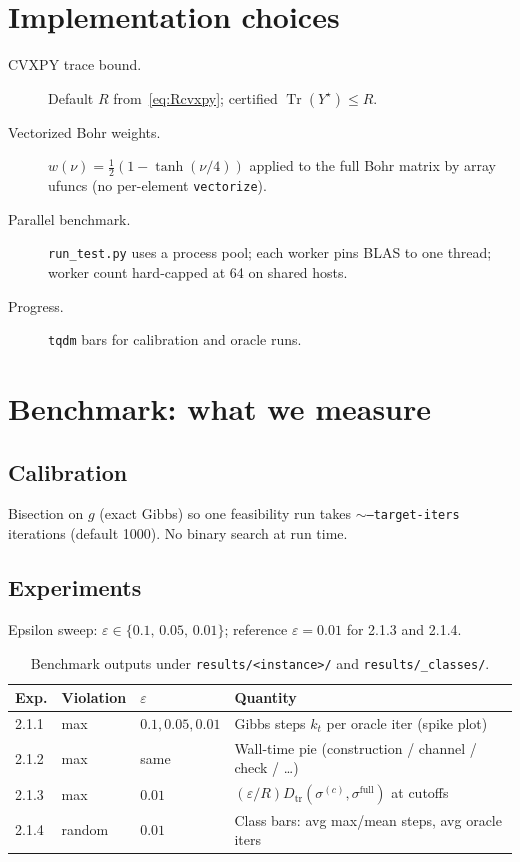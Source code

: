 \documentclass[11pt]{article}
\newcommand{\Tr}{\operatorname{Tr}}
\newcommand{\eps}{\varepsilon}
\newcommand{\dist}{D_{\mathrm{tr}}}
\begin{document}
\section{Implementation choices}
\label{sec:impl}

\begin{description}
  \item[CVXPY trace bound.] Default $R$ from~\eqref{eq:Rcvxpy}; certified
  $\Tr(Y^\star)\le R$.
  \item[Vectorized Bohr weights.] $w(\nu)=\tfrac12(1-\tanh(\nu/4))$ applied to
  the full Bohr matrix by array ufuncs (no per-element \texttt{vectorize}).
  \item[Parallel benchmark.] \texttt{run\_test.py} uses a process pool; each
  worker pins BLAS to one thread; worker count hard-capped at 64 on shared hosts.
  \item[Progress.] \texttt{tqdm} bars for calibration and oracle runs.
\end{description}

\section{Benchmark: what we measure}
\label{sec:measure}

\subsection{Calibration}
Bisection on $g$ (exact Gibbs) so one feasibility run takes
$\sim$\texttt{--target-iters} iterations (default 1000). No binary search at
run time.

\subsection{Experiments}
Epsilon sweep: $\eps\in\{0.1,\,0.05,\,0.01\}$; reference $\eps=0.01$ for 2.1.3
and 2.1.4.

\begin{table}[h]
\centering
\begin{tabular}{@{}llll@{}}
\toprule
Exp. & Violation & $\eps$ & Quantity \\
\midrule
2.1.1 & max & $0.1,0.05,0.01$ & Gibbs steps $k_t$ per oracle iter (spike plot) \\
2.1.2 & max & same & Wall-time pie (construction / channel / check / \ldots) \\
2.1.3 & max & $0.01$ & $(\eps/R)\dist(\sigma^{(c)},\sigma^{\mathrm{full}})$ at cutoffs \\
2.1.4 & random & $0.01$ & Class bars: avg max/mean steps, avg oracle iters \\
\bottomrule
\end{tabular}
\caption{Benchmark outputs under \texttt{results/<instance>/} and
\texttt{results/\_classes/}.}
\end{table}
\end{document}
